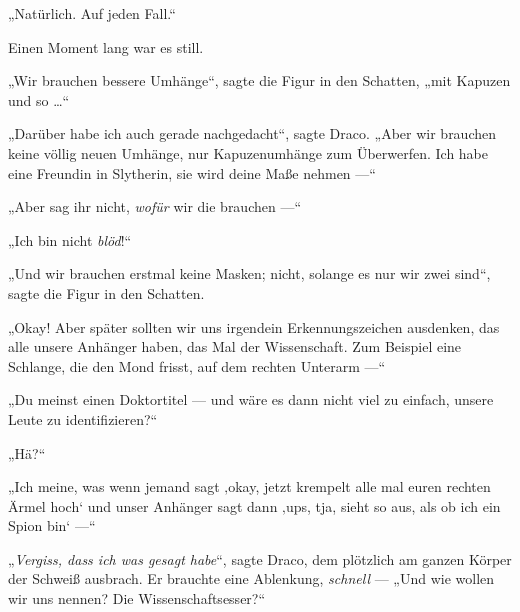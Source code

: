 „Natürlich. Auf jeden Fall.“

Einen Moment lang war es still.

„Wir brauchen bessere Umhänge“, sagte die Figur in den Schatten, „mit Kapuzen und so …“

„Darüber habe ich auch gerade nachgedacht“, sagte Draco.
„Aber wir brauchen keine völlig neuen Umhänge, nur Kapuzenumhänge zum Überwerfen. Ich habe eine Freundin in Slytherin, sie wird deine Maße nehmen —“

„Aber sag ihr nicht, \emph{wofür} wir die brauchen —“

„Ich bin nicht \emph{blöd}!“

„Und wir brauchen erstmal keine Masken; nicht, solange es nur wir zwei sind“, sagte die Figur in den Schatten.

„Okay! Aber später sollten wir uns irgendein Erkennungszeichen ausdenken, das alle unsere Anhänger haben, das Mal der Wissenschaft. Zum Beispiel eine Schlange, die den Mond frisst, auf dem rechten Unterarm —“

„Du meinst einen Doktortitel — und wäre es dann nicht viel zu einfach, unsere Leute zu identifizieren?“

„Hä?“

„Ich meine, was wenn jemand sagt ‚okay, jetzt krempelt alle mal euren rechten Ärmel hoch‘ und unser Anhänger sagt dann ‚ups, tja, sieht so aus, als ob ich ein Spion bin‘ —“

„\emph{Vergiss, dass ich was gesagt habe}“, sagte Draco, dem plötzlich am ganzen Körper der Schweiß ausbrach. Er brauchte eine Ablenkung, \emph{schnell} —
„Und wie wollen wir uns nennen? Die Wissenschaftsesser?“

